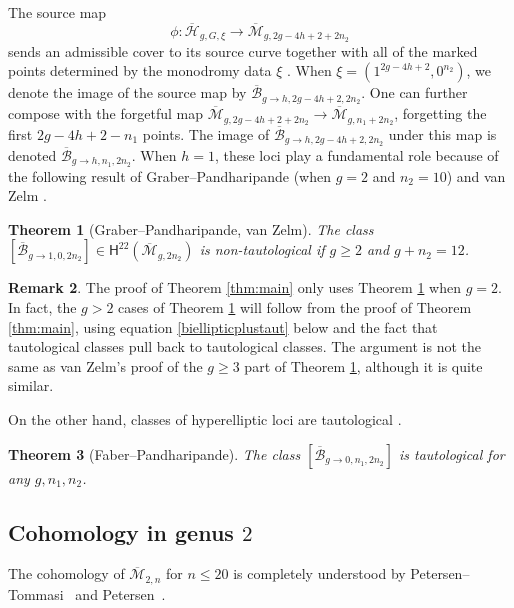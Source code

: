 \documentclass[12pt]{amsart}
\newtheorem{thm}{Theorem}
\theoremstyle{definition}
\newtheorem{rem}[thm]{Remark}
\renewcommand{\H}{\mathsf{H}}
\newcommand{\Bb}{\overline{\mathcal{B}}}
\newcommand{\Hb}{\overline{\mathcal{H}}}
\newcommand{\M}{\mathcal{M}}
\newcommand{\Mb}{\overline{\M}}
\begin{document}
The source map 
\[\phi:\Hb_{g,G,\xi}\rightarrow \Mb_{g,2g-4h+2+2n_2}\]
sends an admissible cover to its source curve together with all of the marked points determined by the monodromy data $\xi$ \cite[Theorem 3.7]{SvZ}. When $\xi=(1^{2g-4h+2},0^{n_2})$, we denote the image of the source map by $\Bb_{g\rightarrow h,2g-4h+2,2n_2}$. One can further compose with the forgetful map $\Mb_{g,2g-4h+2+2n_2}\rightarrow \Mb_{g,n_1+2n_2}$, forgetting the first $2g-4h+2-n_1$ points. The image of $\Bb_{g\rightarrow h,2g-4h+2,2n_2}$ under this map is denoted $\Bb_{g\rightarrow h,n_1,2n_2}$. When $h=1$, these loci play a fundamental role because of the following result of Graber--Pandharipande \cite{GraberPandharipande} (when $g=2$ and $n_2=10$) and van Zelm \cite{vanZelm}.
\begin{thm}[Graber--Pandharipande, van Zelm]\label{biellipticnontaut}
    The class $[\Bb_{g\rightarrow 1,0,2n_2}]\in \H^{22}(\Mb_{g,2n_2})$ is non-tautological if $g\geq 2$ and $g+n_2=12$.
\end{thm}
\begin{rem}\label{newproofvanzelm} The proof of Theorem \ref{thm:main} only uses Theorem \ref{biellipticnontaut} when $g=2$. In fact, the $g>2$ cases of Theorem \ref{biellipticnontaut} will follow from the proof of Theorem \ref{thm:main}, using equation \eqref{biellipticplustaut} below and the fact that tautological classes pull back to tautological classes. The argument is not the same as van Zelm's proof of the $g\geq 3$ part of Theorem \ref{biellipticnontaut}, although it is quite similar.
\end{rem}

On the other hand, classes of hyperelliptic loci are tautological \cite[Proposition 1]{FaberPandharipande}.
\begin{thm}[Faber--Pandharipande]\label{hyperelliptictaut}
The class $[\Bb_{g\rightarrow 0, n_1,2n_2}]$ is tautological for any $g,n_1,n_2$.
\end{thm}


\subsection{Cohomology in genus $2$}
The cohomology of $\Mb_{2,n}$ for $n\leq 20$ is completely understood by Petersen--Tommasi~\cite[Theorems A and B]{PetersenTommasi} and Petersen~\cite[Theorem 3.8]{Petersen}.
\end{document}
